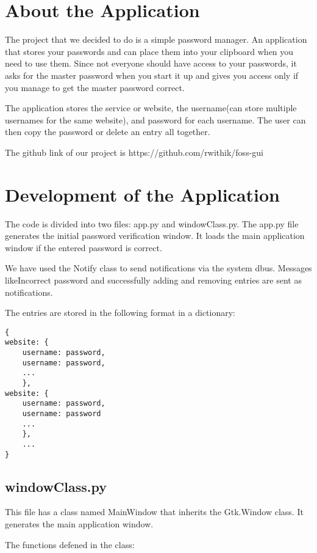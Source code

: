 \documentclass[10pt,a4paper,titlepage]{report}
\begin{document}
\chapter{About the Application}
\newline\par The project that we decided to do is a simple password manager. An application that stores your passwords and can place them into your clipboard when you need to use them. Since not everyone should have access to your passwords, it asks for the master password when you start it up and gives you access only if you manage to get the master password correct. 
\newline\par The application stores the service or website, the username(can store multiple usernames for the same website), and password for each username. The user can then copy the password or delete an entry all together. 
\newline\par The github link of our project is https://github.com/rwithik/foss-gui

\chapter{Development of the Application}
\newline\par The code is divided into two files: app.py and windowClass.py. The app.py file generates the initial password verification window. It loads the main application window if the entered password is correct. 
\newline\par We have used the Notify class to send notifications via the system dbus. Messages likeIncorrect password and successfully adding and removing entries are sent as notifications. 
\newline\par The entries are stored in the following format in a dictionary:
\begin{verbatim}
{
website: {
	username: password, 
	username: password, 
	...
	}, 
website: {
	username: password, 
	username: password
	...
	}, 
	...
}
\end{verbatim}

\section{windowClass.py}
\newline\par This file has a class named MainWindow that inherits the Gtk.Window class. It generates the main application window.
\newline\par The functions defened in the class:
\end{document}
